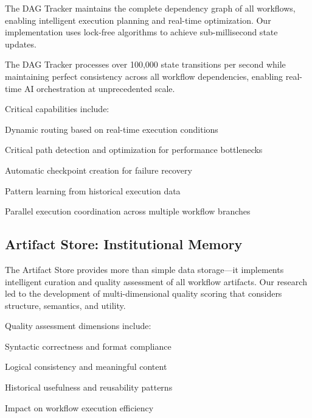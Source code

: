 The DAG Tracker maintains the complete dependency graph of all workflows, enabling intelligent execution planning and real-time optimization. Our implementation uses lock-free algorithms to achieve sub-millisecond state updates.

\begin{alertbox}
The DAG Tracker processes over 100,000 state transitions per second while maintaining perfect consistency across all workflow dependencies, enabling real-time AI orchestration at unprecedented scale.
\end{alertbox}

Critical capabilities include:

\begin{compactlist}
    \item Dynamic routing based on real-time execution conditions
    \item Critical path detection and optimization for performance bottlenecks
    \item Automatic checkpoint creation for failure recovery
    \item Pattern learning from historical execution data
    \item Parallel execution coordination across multiple workflow branches
\end{compactlist}

\subsection*{Artifact Store: Institutional Memory}

The Artifact Store provides more than simple data storage—it implements intelligent curation and quality assessment of all workflow artifacts. Our research led to the development of multi-dimensional quality scoring that considers structure, semantics, and utility.

Quality assessment dimensions include:

\begin{description}[leftmargin=4cm,labelwidth=3.5cm]
    \item[\textbf{Structural Quality}] Syntactic correctness and format compliance
    \item[\textbf{Semantic Quality}] Logical consistency and meaningful content
    \item[\textbf{Utility Quality}] Historical usefulness and reusability patterns
    \item[\textbf{Performance Quality}] Impact on workflow execution efficiency
\end{description}

